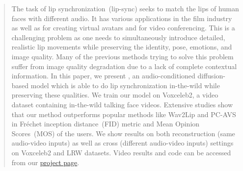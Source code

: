 \begin{abstract}
The task of lip synchronization~(lip-sync) seeks to match the lips of human faces with different audio.   
It has various applications in the film industry as well as for creating virtual avatars and for video conferencing. 
This is a challenging problem as one needs to simultaneously introduce detailed, realistic lip movements while preserving the identity, pose, emotions, and image quality. Many of the previous methods trying to solve this problem suffer from image quality degradation due to a lack of complete contextual information.
In this paper, we present \ours, an audio-conditioned diffusion-based model which is able to do lip synchronization in-the-wild while preserving these qualities.
We train our model on Voxceleb2, a video dataset containing in-the-wild talking face videos.   
Extensive studies show that our method outperforms popular methods like Wav2Lip and PC-AVS in Fréchet inception distance~(FID) metric and Mean Opinion Scores~(MOS) of the users. We show results on both reconstruction (same audio-video inputs) as well as cross (different audio-video inputs) settings on Voxceleb2 and LRW datasets. Video results and code can be accessed from our \href{https://soumik-kanad.github.io/diff2lip}{project page}.


\end{abstract}

\vspace{-0.2in}